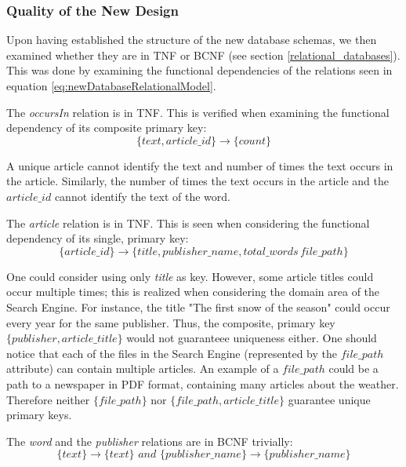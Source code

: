 \subsubsection*{Quality of the New Design}
Upon having established the structure of the new database schemas, we then examined whether they are in TNF or BCNF (see section \ref{relational_databases}).
This was done by examining the functional dependencies of the relations seen in equation \ref{eq:newDatabaseRelationalModel}.

The \textit{occursIn} relation is in TNF. 
This is verified when examining the functional dependency of its composite primary key:
\begin{equation*}
 \{text,article\_id\}\rightarrow \{count\}   
\end{equation*}

A unique article cannot identify the text and number of times the text occurs in the article.
Similarly, the number of times the text occurs in the article and the $article\_id$ cannot identify the text of the word.

The \textit{article} relation is in TNF. 
This is seen when considering the functional dependency of its single, primary key:
\begin{equation*}
    \{article\_id\} \rightarrow \{title, publisher\_name,total\_words\, file\_path\}
\end{equation*}

One could consider using only \textit{title} as key. 
However, some article titles could occur multiple times; this is realized when considering the domain area of the \knox{} Search Engine.
For instance, the title "The first snow of the season" could occur every year for the same publisher.
Thus, the composite, primary key $\{ publisher,article\_title \}$ would not guaranteee uniqueness either.
One should notice that each of the files in the Search Engine (represented by the $file\_path$ attribute) can contain multiple articles.
An example of a $file\_path$ could be a path to a newspaper in PDF format, containing many articles about the weather.
Therefore neither $\{file\_path\}$ nor $\{ file\_path, article\_title \}$ guarantee unique primary keys.


The \textit{word} and the \textit{publisher} relations are in BCNF trivially:
\begin{equation*}
    \{ text\} \rightarrow \{text\} \textit{\ and\ } \{ publisher\_name \} \rightarrow \{ publisher\_name\}
\end{equation*}

